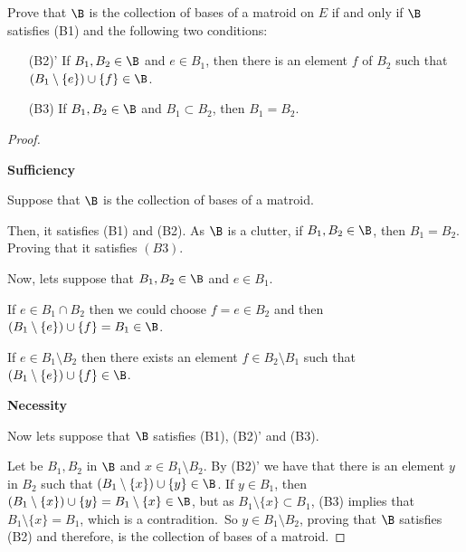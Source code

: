 \prob
{
    Prove that $\B$ is the collection of bases of a matroid on 
    $E$ if and only if $\B$ satisfies (B1) and the following two conditions:
    
    \begin{itemize}
        \item[(B2)'] If $B_1, B_2 \in \B$ and $e \in B_1$, then there is an element $f$ of
                        $B_2$ such that $(B_1 \setminus \{e\}) \cup \{f\} \in \B$.
                        
        \item[(B3)] If $B_1, B_2 \in \B$ and $B_1 \subset B_2$, then $B_1 = B_2$.
    \end{itemize}
}

\begin{proof}
    $\,$\pn
    
    \textbf{Sufficiency}\pn
        
    Suppose that $\B$ is the collection of bases of a matroid.\pn
    
    Then, it satisfies (B1) and (B2). As $\B$ is a clutter, if $B_1, B_2 \in \B$, then
    $B_1 = B_2$. Proving that it satisfies $(B3)$.\pn 
    
    Now, lets suppose that $B_1, B_2 \in \B$ and $e \in B_1$.\pn 
    
    If $e \in B_1 \cap B_2$ then we could choose $f = e \in B_2$ and then 
    $(B_1 \setminus \{e\}) \cup \{f\} = B_1 \in \B$.\pn
    
    If $e \in B_1 \setminus B_2$ then there exists an element $f \in B_2 \setminus B_1$ such that
    $(B_1 \setminus \{e\}) \cup \{ f \} \in \B$.\pn
    
    \textbf{Necessity}
    
    Now lets suppose that $\B$ satisfies (B1), (B2)' and (B3).\pn
    
    Let be $B_1, B_2$ in $\B$ and $x \in B_1 \setminus B_2$. By (B2)' we have that there is 
    an element $y$ in $B_2$ such that $(B_1 \setminus \{x\}) \cup \{y\} \in \B$. If
    $y \in B_1$, then $(B_1 \setminus \{x\}) \cup \{y\} = B_1 \setminus \{x\} \in \B$, but as
    $B_1 \setminus \{x\} \subset B_1$, (B3) implies that $B_1 \setminus \{x\} = B_1$, which is a contradition.\
    So $y \in B_1 \setminus B_2$, proving that $\B$ satisfies (B2) and therefore, is the
    collection of bases of a matroid.
\end{proof}